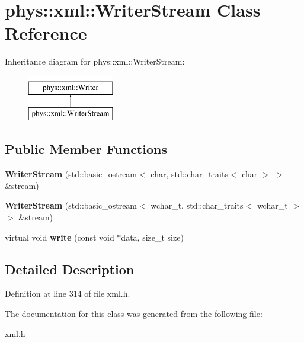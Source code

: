 \hypertarget{classphys_1_1xml_1_1WriterStream}{
\section{phys::xml::WriterStream Class Reference}
\label{d5/d6f/classphys_1_1xml_1_1WriterStream}
}
Inheritance diagram for phys::xml::WriterStream:\begin{figure}[H]
\begin{center}
\leavevmode
\includegraphics[height=2.000000cm]{d5/d6f/classphys_1_1xml_1_1WriterStream}
\end{center}
\end{figure}
\subsection*{Public Member Functions}
\begin{DoxyCompactItemize}
\item 
\hypertarget{classphys_1_1xml_1_1WriterStream_ae170ab7c429b6f7149d3540243329dfa}{
{\bfseries WriterStream} (std::basic\_\-ostream$<$ char, std::char\_\-traits$<$ char $>$ $>$ \&stream)}
\label{d5/d6f/classphys_1_1xml_1_1WriterStream_ae170ab7c429b6f7149d3540243329dfa}

\item 
\hypertarget{classphys_1_1xml_1_1WriterStream_aaebcd545af8e44cf6556a46077f0a366}{
{\bfseries WriterStream} (std::basic\_\-ostream$<$ wchar\_\-t, std::char\_\-traits$<$ wchar\_\-t $>$ $>$ \&stream)}
\label{d5/d6f/classphys_1_1xml_1_1WriterStream_aaebcd545af8e44cf6556a46077f0a366}

\item 
\hypertarget{classphys_1_1xml_1_1WriterStream_a806e7d693cd21a2706b628bbd195bedd}{
virtual void {\bfseries write} (const void $\ast$data, size\_\-t size)}
\label{d5/d6f/classphys_1_1xml_1_1WriterStream_a806e7d693cd21a2706b628bbd195bedd}

\end{DoxyCompactItemize}


\subsection{Detailed Description}


Definition at line 314 of file xml.h.



The documentation for this class was generated from the following file:\begin{DoxyCompactItemize}
\item 
\hyperlink{xml_8h}{xml.h}\end{DoxyCompactItemize}
